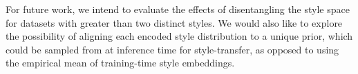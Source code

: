 \documentclass[letterpaper]{article} %
\newcommand{\loss}[1]{J_{\text{#1}}}
\begin{document}
For future work, we intend to evaluate the effects of disentangling the style space for datasets with greater than two distinct styles.
We would also like to explore the possibility of aligning each encoded style distribution to a unique prior, which could be sampled from at inference time for style-transfer, as opposed to using the empirical mean of training-time style embeddings.











\end{document}
